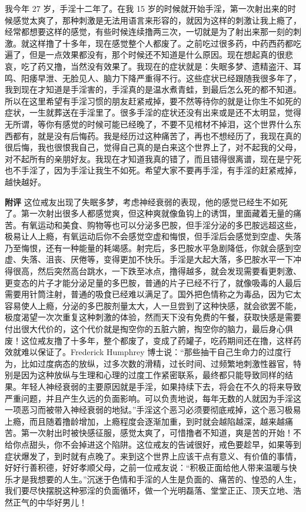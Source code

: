 \begin{case}
    我今年 27 岁，手淫十二年了。在我 15 岁的时候就开始手淫，第一次射出来的时候感觉太爽了，那种刺激是无法用语言来形容的，就因为这样的刺激让我上瘾了，经常都想要这样的感觉，有些时候连续撸两三次，一切就是为了射出来那一刻的刺激。就这样撸了十多年，现在感觉整个人都废了。之前吃过很多药，中药西药都吃遍了，但是一点效果都没有，那个时候还不知道是什么原因。现在想起真的很悲哀，吃了药又撸，当然没有效果了。我现在的症状就是：失眠多梦、遗精盗汗、耳鸣、阳痿早泄、无脸见人、脑力下降严重得不行。这些症状已经跟随我很多年了，我到现在才知道是手淫害的，手淫真的是温水煮青蛙，到最后怎么死的都不知道。所以在这里希望有手淫习惯的朋友赶紧戒掉，要不然等待你的就是让你生不如死的症状，一生就葬送在手淫里了。很多手淫的症状还没有出来或是还不太明显，觉得无所谓，等你有感觉的时候可能已经晚了，不要不见棺材不掉泪，这个世界什么东西都有，就是没有后悔药。我是经历过这种痛苦了，再也不想经历了，我现在真的很后悔，我也很恨我自己，觉得自己真的是白来这个世界上了，对不起我的父母，对不起所有的亲朋好友。我现在才知道我真的错了，而且错得很离谱，现在是宁死也不手淫了，因为手淫让我生不如死。希望大家不要再手淫，有手淫的赶紧戒掉，越快越好。

    \textbf{附评} 这位戒友出现了失眠多梦，考虑神经衰弱的表现，他的感觉已经生不如死了。第一次射出很多人都感觉爽，但这种爽就像鱼钩上的诱饵，里面藏着无量的痛苦。有氧运动和美食、购物等也可以分泌多巴胺，但手淫分泌的多巴胺远超这些，极易让人上瘾，有氧运动后你不会感觉空虚和悔恨，但手淫后会感觉到空虚、失落乃至悔恨，还有一种能量的耗竭感。射完后，多巴胺水平急剧降低，你就会感到空虚、失落、沮丧、厌倦等，变得更加不快乐。手淫是大起大落，多巴胺水平一下冲得很高，然后突然高台跳水，一下跌至冰点，撸得越多，就会发现需要看更刺激、更变态的片子才能分泌足量的多巴胺，普通的片子已经不行了，就像吸毒的人最后需要用针筒注射，普通的吸食已经难以满足了。国外把色情称之为毒品，因为它太容易使人上瘾，分泌的多巴胺剂量太大，人一旦尝到了这种快感，就会欲罢不能，极度渴望一次次重复这种刺激的体验，然而天下没有免费的午餐，获取快感是需要付出很大代价的，这个代价就是掏空你的五脏六腑，掏空你的脑力，最后身心俱废！这位戒友撸了十多年，整个都废了，变成了药罐子，吃药期间还在撸，这样药效就难以保证了。Frederick Humphrey 博士说：“那些抽干自己生命力的过度行为，比如过度病态的放纵，过多次数的滑精，过长时间、过频繁地刺激性器官，特别是因为这种放纵与生理和心理的过度工作紧密联系，最终都只能导致同样的结果。年轻人神经衰弱的主要原因就是手淫，如果持续下去，将会在不久的将来导致严重问题，并且产生久远的负面影响。可以负责地说，每年无数的人就因为手淫这一项恶习而被带入神经衰弱的地狱。”手淫这个恶习必须要彻底戒掉，这个恶习极易上瘾，而且随着撸龄增加，上瘾程度会逐渐加重，到时就会越陷越深，越来越痛苦。第一次射出时被快感征服，感觉太爽了，可惜撸者不知道，爽是苦的开始！不给你点甜头，你不会掉进这个陷阱。这位戒友的告诫很好，戒色要趁早，如果等到症状爆发了，到时就有点晚了。来到这个世界上应该干点有意义、有价值的事情，好好行善积德，好好孝顺父母，之前一位戒友说：“积极正面给他人带来温暖与快乐才是我想要的人生。”沉迷于色情和手淫的人生是负面的、痛苦的、惶恐的人生，我们要尽快摆脱这种邪淫的负面循环，做一个光明磊落、堂堂正正、顶天立地、浩然正气的中华好男儿！
\end{case}

